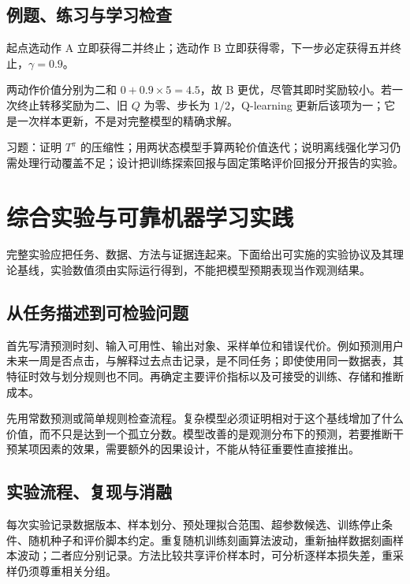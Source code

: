 \documentclass[UTF8,12pt,a4paper,fontset=fandol]{ctexbook}
\begin{document}
\section{例题、练习与学习检查}

\begin{example}[即时奖励与长期回报]
起点选动作 A 立即获得二并终止；选动作 B 立即获得零，下一步必定获得五并终止，$\gamma=0.9$。
\end{example}
\begin{solve}
两动作价值分别为二和 $0+0.9\times5=4.5$，故 B 更优，尽管其即时奖励较小。若一次终止转移奖励为二、旧 $Q$ 为零、步长为 $1/2$，Q-learning 更新后该项为一；它是一次样本更新，不是对完整模型的精确求解。
\end{solve}

习题：证明 $T^\pi$ 的压缩性；用两状态模型手算两轮价值迭代；说明离线强化学习仍需处理行动覆盖不足；设计把训练探索回报与固定策略评价回报分开报告的实验。

\chapter{综合实验与可靠机器学习实践}
\label{chap:ml-practice}

完整实验应把任务、数据、方法与证据连起来。下面给出可实施的实验协议及其理论基线，实验数值须由实际运行得到，不能把模型预期表现当作观测结果。

\section{从任务描述到可检验问题}

首先写清预测时刻、输入可用性、输出对象、采样单位和错误代价。例如预测用户未来一周是否点击，与解释过去点击记录，是不同任务；即使使用同一数据表，其特征时效与划分规则也不同。再确定主要评价指标以及可接受的训练、存储和推断成本。

先用常数预测或简单规则检查流程。复杂模型必须证明相对于这个基线增加了什么价值，而不只是达到一个孤立分数。模型改善的是观测分布下的预测，若要推断干预某项因素的效果，需要额外的因果设计，不能从特征重要性直接推出。

\section{实验流程、复现与消融}

每次实验记录数据版本、样本划分、预处理拟合范围、超参数候选、训练停止条件、随机种子和评价脚本约定。重复随机训练刻画算法波动，重新抽样数据刻画样本波动；二者应分别记录。方法比较共享评价样本时，可分析逐样本损失差，重采样仍须尊重相关分组。
\end{document}
